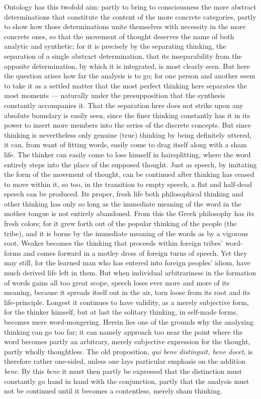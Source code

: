 \documentclass[12pt]{article}
\newcommand{\opage}[1]{\marginnote{\footnotesize\textit{[#1]}}}
\begin{document}
Ontology has this twofold aim: partly to bring to consciousness the more abstract
determinations that constitute the content of the more concrete categories, partly
to show how those determinations unite themselves with necessity in the more
concrete ones, so that the movement of thought deserves the name of both analytic
and synthetic; for it is precisely by the separating thinking, the separation of a
single abstract determination, that its inseparability from the opposite
determination, by which it is integrated, is most clearly seen. But here the
question arises how far the analysis is to go; for one person and another seem to
take it as a settled matter that the most perfect thinking here separates the most
moments --- naturally under the presupposition that the synthesis constantly
accompanies it. That the separation here does not strike upon any absolute
boundary is easily seen, since the finer thinking constantly has it in its power to
insert more members into the series of the discrete concepts. But since thinking is
nevertheless only genuine (true) thinking by being definitely uttered, it can, from
want of fitting words, easily come to drag itself along with a sham life. The
thinker can easily come to lose himself in hairsplitting, where the word entirely
steps into the \opage{204}place of the supposed thought. Just as speech, by
imitating the form of the movement of thought, can be continued after thinking has
ceased to move within it, so too, in the transition to empty speech, a flat and
half-dead speech can be produced. Its proper, fresh life both philosophical
thinking and other thinking has only so long as the immediate meaning of the word
in the mother tongue is not entirely abandoned. From this the Greek philosophy has
its fresh colors; for it grew forth out of the popular thinking of the people (the
tribe), and it is borne by the immediate meaning of the words as by a vigorous
root. Weaker becomes the thinking that proceeds within foreign tribes' word-forms
and comes forward in a motley dress of foreign turns of speech. Yet they may still,
for the learned man who has entered into foreign peoples' idiom, have much derived
life left in them. But when individual arbitrariness in the formation of words
gains all too great scope, speech loses ever more and more of its meaning, because
it spreads itself out in the air, torn loose from its root and its life-principle.
Longest it continues to have validity, as a merely subjective form, for the thinker
himself, but at last the solitary thinking, in self-made forms, becomes mere
word-mongering. Herein lies one of the grounds why the analyzing thinking can go
too far; it can namely approach too near the point where the word becomes partly an
arbitrary, merely subjective expression for the thought, partly wholly thoughtless.
The old proposition, \textit{qui bene distinguit, bene docet}, is therefore rather
one-sided, unless one lays particular emphasis on the addition \textit{bene}. By
this \textit{bene} it must then partly be expressed that the distinction must
constantly go hand in hand with the conjunction, partly that the analysis must not
be continued until it becomes a contentless, merely sham thinking.
\end{document}
